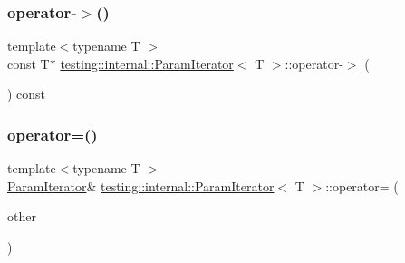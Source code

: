 \mbox{\label{classtesting_1_1internal_1_1_param_iterator_aad035d35e8f0c1412854959a94d4887e}} 
\subsubsection{\texorpdfstring{operator-\/$>$()}{operator->()}\hspace{0.1cm}{\footnotesize\ttfamily [3/3]}}
{\footnotesize\ttfamily template$<$typename T $>$ \\
const T$\ast$ \mbox{\hyperlink{classtesting_1_1internal_1_1_param_iterator}{testing\+::internal\+::\+Param\+Iterator}}$<$ T $>$\+::operator-\/$>$ (\begin{DoxyParamCaption}{ }\end{DoxyParamCaption}) const\hspace{0.3cm}{\ttfamily [inline]}}

\mbox{\label{classtesting_1_1internal_1_1_param_iterator_a8019f54ea1c66ca39ffdec47acfabfe6}} 
\subsubsection{\texorpdfstring{operator=()}{operator=()}\hspace{0.1cm}{\footnotesize\ttfamily [1/3]}}
{\footnotesize\ttfamily template$<$typename T $>$ \\
\mbox{\hyperlink{classtesting_1_1internal_1_1_param_iterator}{Param\+Iterator}}\& \mbox{\hyperlink{classtesting_1_1internal_1_1_param_iterator}{testing\+::internal\+::\+Param\+Iterator}}$<$ T $>$\+::operator= (\begin{DoxyParamCaption}\item[{const \mbox{\hyperlink{classtesting_1_1internal_1_1_param_iterator}{Param\+Iterator}}$<$ T $>$ \&}]{other }\end{DoxyParamCaption})\hspace{0.3cm}{\ttfamily [inline]}}


